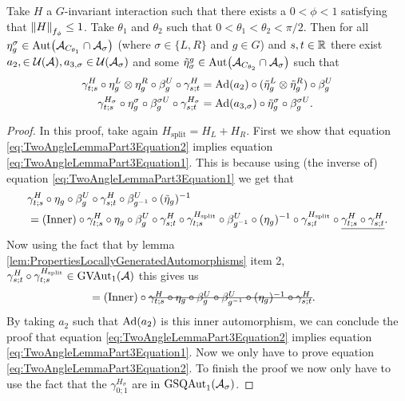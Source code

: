 \documentclass[12pt,a4paper,twoside]{article}
\numberwithin{equation}{section}
\begin{document}
\begin{lemma}\label{lem:TwoAngleLemmaPart3}
	Take $H$ a $G$-invariant interaction such that there exists a $0<\phi<1$ satisfying that $\norm{H}_{f_\phi}\leq 1$. Take $\theta_1$ and $\theta_2$ such that $0<\theta_1<\theta_2<\pi/2$. Then for all $\eta_{g}^{\sigma}\in\Aut{\AA_{C_{\theta_1}}\cap\AA_{\sigma}}$ (where $\sigma\in\{L,R\}$ and $g\in G$) and $s,t\in\RR$ there exist $a_{2},\in\UU(\AA),a_{3,\sigma}\in\UU(\AA_\sigma)$ and some $\tilde{\eta}_{\sigma}^g\in \Aut{\AA_{C_{\theta_2}}\cap\AA_{\sigma}}$ such that
	\begin{align}
		\label{eq:TwoAngleLemmaPart3Equation1}
		\gamma^{H}_{t;s}\circ\eta_{g}^L\otimes\eta_{g}^R\circ\beta_g^U\circ\gamma^{H}_{s;t}&=\Ad{a_2}\circ(\tilde\eta_{g}^L \otimes\tilde\eta_{g}^R)\circ\beta_g^U\\
		\label{eq:TwoAngleLemmaPart3Equation2}
		\gamma^{H_\sigma}_{t;s}\circ\eta_g^\sigma\circ\beta_g^{\sigma U}\circ\gamma^{H_\sigma}_{s;t}&=\Ad{a_{3,\sigma}}\circ \tilde\eta_{g}^\sigma\circ\beta_g^{\sigma U}.
	\end{align}
\end{lemma}
\begin{proof}
	In this proof, take again $H_{\text{split}}=H_L+H_R$. First we show that equation \eqref{eq:TwoAngleLemmaPart3Equation2} implies equation \eqref{eq:TwoAngleLemmaPart3Equation1}. This is because using (the inverse of) equation \eqref{eq:TwoAngleLemmaPart3Equation1} we get that
	\begin{align}
		&\gamma^H_{t;s}\circ\eta_g\circ\beta_g^U\circ\gamma^H_{s;t}\circ\beta_{g^{-1}}^U\circ(\tilde{\eta}_g)^{-1}\\
		&=(\text{Inner})\circ \gamma^H_{t;s}\circ\eta_g\circ\beta_g^U\circ\gamma^H_{s;t}\circ\gamma^\Hsplit_{t;s}\circ\beta_{g^{-1}}^U\circ(\eta_g)^{-1}\circ\gamma^\Hsplit_{s;t}\circ\underline{\gamma^H_{t;s}\circ\gamma^H_{s;t}}.
	\end{align}
	Now using the fact that by lemma \ref{lem:PropertiesLocallyGeneratedAutomorphisms} item 2, $\gamma^H_{s;t}\circ\gamma^\Hsplit_{t;s}\in\textrm{GVAut}_1(\AA)$ this gives us
	\begin{align}
		&=(\text{Inner})\circ\stkout{\gamma^H_{t;s}\circ\eta_g\circ\beta_g^U\circ\beta_{g^{-1}}^U\circ(\eta_g)^{-1}\circ\gamma^H_{s;t}}.
	\end{align}
	By taking $a_2$ such that $\Ad{a_2}$ is this inner automorphism, we can conclude the proof that equation \eqref{eq:TwoAngleLemmaPart3Equation2} implies equation \eqref{eq:TwoAngleLemmaPart3Equation1}. Now we only have to prove equation \eqref{eq:TwoAngleLemmaPart3Equation2}. To finish the proof we now only have to use the fact that the $\gamma^{H_\sigma}_{0;1}$ are in $\textrm{GSQAut}_1(\AA_\sigma)$.
\end{proof}
\end{document}
